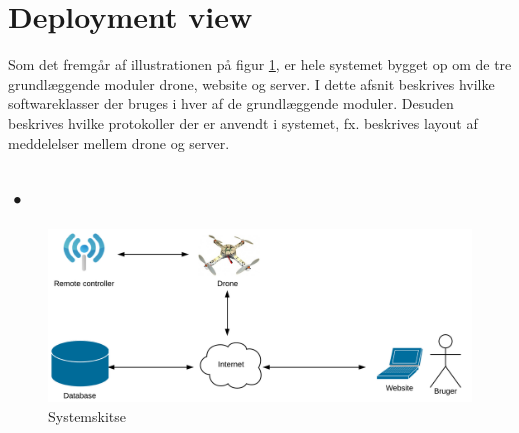 \section{Deployment view}

Som det fremgår af illustrationen på figur \ref{fig:systemskitse_deployment}, er hele systemet bygget op om de tre grundlæggende moduler drone, website og server. I dette afsnit beskrives hvilke softwareklasser der bruges i hver af de grundlæggende moduler. Desuden beskrives hvilke protokoller der er anvendt i systemet, fx. beskrives layout af meddelelser mellem drone og server.

\subsection{•}


\begin{figure}[H]
\centering
\includegraphics[width=1\textwidth]{Billeder/systemskitse_deployment_view.png}
\caption{Systemskitse}
\label{fig:systemskitse_deployment}
\end{figure}



